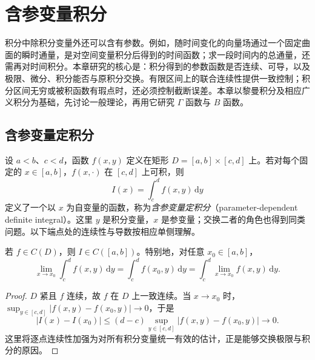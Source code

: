 \setcounter{chapter}{16} %
\chapter{含参变量积分}
\label{chap:parameter-dependent-integrals}

积分中除积分变量外还可以含有参数。例如，随时间变化的向量场通过一个固定曲面的瞬时通量，是对空间变量积分后得到的时间函数；求一段时间内的总通量，还需再对时间积分。本章研究的核心是：积分得到的参数函数是否连续、可导，以及极限、微分、积分能否与原积分交换。有限区间上的联合连续性提供一致控制；积分区间无穷或被积函数有瑕点时，还必须控制截断误差。本章以黎曼积分及相应广义积分为基础，先讨论一般理论，再用它研究 $\Gamma$ 函数与 $B$ 函数。

\section{含参变量定积分}
\label{sec:parameter-dependent-definite-integrals}

设 $a<b$、$c<d$，函数 $f(x,y)$ 定义在矩形 $D=[a,b]\times[c,d]$ 上。若对每个固定的 $x\in[a,b]$，$f(x,\cdot)$ 在 $[c,d]$ 上可积，则
\[
    I(x)=\int_c^d f(x,y)\,\mathrm{d}y
\]
定义了一个以 $x$ 为自变量的函数，称为\emph{含参变量定积分}（parameter-dependent definite integral）。这里 $y$ 是积分变量，$x$ 是参变量；交换二者的角色也得到同类问题。以下端点处的连续性与导数按相应单侧理解。

\begin{theorem}[连续性与极限交换]
\label{thm:parameter-finite-integral-continuity}
若 $f\in C(D)$，则 $I\in C([a,b])$。特别地，对任意 $x_0\in[a,b]$，
\begin{equation}
    \lim_{x\to x_0}\int_c^d f(x,y)\,\mathrm{d}y
    =\int_c^d f(x_0,y)\,\mathrm{d}y
    =\int_c^d\lim_{x\to x_0}f(x,y)\,\mathrm{d}y.
    \label{eq:parameter-finite-limit-exchange}
\end{equation}
\end{theorem}

\begin{proof}
$D$ 紧且 $f$ 连续，故 $f$ 在 $D$ 上一致连续。当 $x\to x_0$ 时，$\sup_{y\in[c,d]}|f(x,y)-f(x_0,y)|\to0$，于是
\[
    |I(x)-I(x_0)|\leq(d-c)
    \sup_{y\in[c,d]}|f(x,y)-f(x_0,y)|\longrightarrow0.
\]
这里将逐点连续性加强为对所有积分变量统一有效的估计，正是能够交换极限与积分的原因。
\end{proof}

